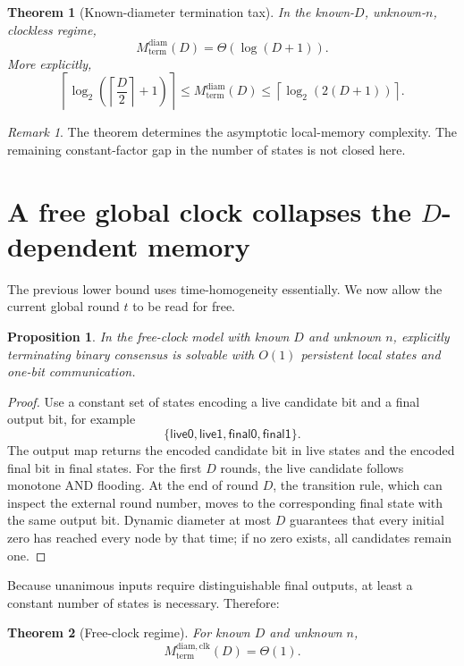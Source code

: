 \documentclass[11pt]{article}
\newtheorem{theorem}{Theorem}
\newtheorem{proposition}{Proposition}
\theoremstyle{remark}
\newtheorem{remark}{Remark}
\begin{document}
\begin{theorem}[Known-diameter termination tax]
In the known-$D$, unknown-$n$, clockless regime,
\[
\boxed{M_{\mathrm{term}}^{\mathrm{diam}}(D)=\Theta(\log(D+1)).}
\]
More explicitly,
\[
\left\lceil\log_2\left(\left\lceil\frac D2\right\rceil+1\right)\right\rceil
\le
M_{\mathrm{term}}^{\mathrm{diam}}(D)
\le
\left\lceil\log_2(2(D+1))\right\rceil.
\]
\end{theorem}

\begin{remark}
The theorem determines the asymptotic local-memory complexity. The remaining constant-factor gap in the number of states is not closed here.
\end{remark}

\section{A free global clock collapses the \texorpdfstring{$D$}{D}-dependent memory}
The previous lower bound uses time-homogeneity essentially. We now allow the current global round $t$ to be read for free.

\begin{proposition}
In the free-clock model with known $D$ and unknown $n$, explicitly terminating binary consensus is solvable with $O(1)$ persistent local states and one-bit communication.
\end{proposition}
\begin{proof}
Use a constant set of states encoding a live candidate bit and a final output bit, for example
\[
\{\textsf{live0},\textsf{live1},\textsf{final0},\textsf{final1}\}.
\]
The output map returns the encoded candidate bit in live states and the encoded final bit in final states. For the first $D$ rounds, the live candidate follows monotone AND flooding. At the end of round $D$, the transition rule, which can inspect the external round number, moves to the corresponding final state with the same output bit. Dynamic diameter at most $D$ guarantees that every initial zero has reached every node by that time; if no zero exists, all candidates remain one.
\end{proof}

Because unanimous inputs require distinguishable final outputs, at least a constant number of states is necessary. Therefore:

\begin{theorem}[Free-clock regime]
For known $D$ and unknown $n$,
\[
\boxed{M_{\mathrm{term}}^{\mathrm{diam,clk}}(D)=\Theta(1).}
\]
\end{theorem}
\end{document}
